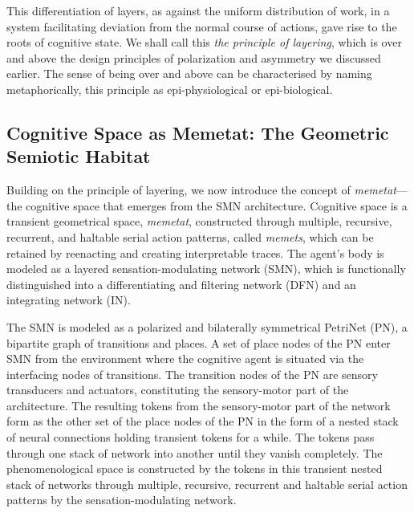 This differentiation of layers, as against the uniform distribution of work, in a system facilitating deviation from the normal course of actions, gave rise to the roots of cognitive state. We shall call this \textit{the principle of layering}, which is over and above the design principles of polarization and asymmetry we discussed earlier. The sense of being over and above can be characterised by naming metaphorically, this principle as epi-physiological or epi-biological.

\subsection{Cognitive Space as Memetat: The Geometric Semiotic Habitat}
\label{subsec:memetat}

Building on the principle of layering, we now introduce the concept of \textit{memetat}—the cognitive space that emerges from the SMN architecture. Cognitive space is a transient geometrical space, \textit{memetat}, constructed through multiple, recursive, recurrent, and haltable serial action patterns, called \textit{memets}, which can be retained by reenacting and creating interpretable traces. The agent's body is modeled as a layered sensation-modulating network (SMN), which is functionally distinguished into a differentiating and filtering network (DFN) and an integrating network (IN).

The SMN is modeled as a polarized and bilaterally symmetrical PetriNet (PN), a bipartite graph of transitions and places. A set of place nodes of the PN enter SMN from the environment where the cognitive agent is situated via the interfacing nodes of transitions. The transition nodes of the PN are sensory transducers and actuators, constituting the sensory-motor part of the architecture. The resulting tokens from the sensory-motor part of the network form as the other set of the place nodes of the PN in the form of a nested stack of neural connections holding transient tokens for a while. The tokens pass through one stack of network into another until they vanish completely. The phenomenological space is constructed by the tokens in this transient nested stack of networks through multiple, recursive, recurrent and haltable serial action patterns by the sensation-modulating network.

